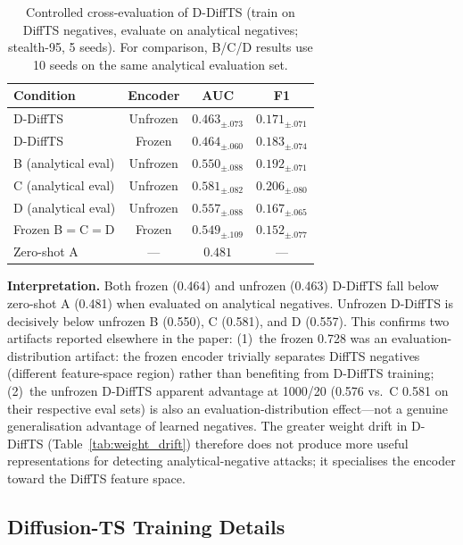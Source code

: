 \begin{table}[h]
\centering
\small
\caption{
  Controlled cross-evaluation of D-DiffTS (train on DiffTS negatives,
  evaluate on analytical negatives; stealth-95, 5 seeds).
  For comparison, B/C/D results use 10 seeds on the same analytical evaluation set.
}
\label{tab:controlled_frozen}
\begin{tabular}{lccc}
\toprule
Condition & Encoder & AUC & F1 \\
\midrule
D-DiffTS & Unfrozen & $0.463_{\pm.073}$ & $0.171_{\pm.071}$ \\
D-DiffTS & Frozen   & $0.464_{\pm.060}$ & $0.183_{\pm.074}$ \\
\midrule
B (analytical eval) & Unfrozen & $0.550_{\pm.088}$ & $0.192_{\pm.071}$ \\
C (analytical eval) & Unfrozen & $0.581_{\pm.082}$ & $0.206_{\pm.080}$ \\
D (analytical eval) & Unfrozen & $0.557_{\pm.088}$ & $0.167_{\pm.065}$ \\
Frozen B$=$C$=$D    & Frozen   & $0.549_{\pm.109}$ & $0.152_{\pm.077}$ \\
Zero-shot A         & ---      & $0.481$           & --- \\
\bottomrule
\end{tabular}
\end{table}

\textbf{Interpretation.}
Both frozen (0.464) and unfrozen (0.463) D-DiffTS fall below zero-shot A (0.481)
when evaluated on analytical negatives.
Unfrozen D-DiffTS is decisively below unfrozen B (0.550), C (0.581), and D (0.557).
This confirms two artifacts reported elsewhere in the paper:
(1)~the frozen 0.728 was an evaluation-distribution artifact: the frozen
encoder trivially separates DiffTS negatives (different feature-space region)
rather than benefiting from D-DiffTS training;
(2)~the unfrozen D-DiffTS apparent advantage at 1000/20 (0.576 vs.\ C 0.581
on their respective eval sets) is also an evaluation-distribution effect---not
a genuine generalisation advantage of learned negatives.
The greater weight drift in D-DiffTS (Table~\ref{tab:weight_drift}) therefore
does not produce more useful representations for detecting analytical-negative
attacks; it specialises the encoder toward the DiffTS feature space.

\subsection{Diffusion-TS Training Details}
\label{app:diffts_training}

